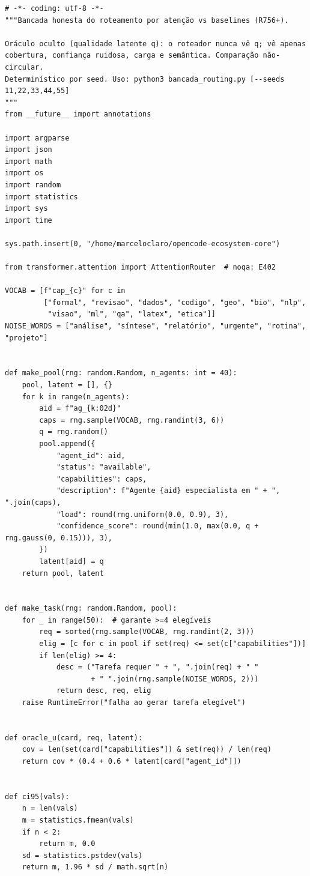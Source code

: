 \documentclass[12pt,openany,oneside,a4paper,brazil,chapter=TITLE]{abntex2}
\begin{document}
\begin{lstlisting}
# -*- coding: utf-8 -*-
"""Bancada honesta do roteamento por atenção vs baselines (R756+).

Oráculo oculto (qualidade latente q): o roteador nunca vê q; vê apenas
cobertura, confiança ruidosa, carga e semântica. Comparação não-circular.
Determinístico por seed. Uso: python3 bancada_routing.py [--seeds 11,22,33,44,55]
"""
from __future__ import annotations

import argparse
import json
import math
import os
import random
import statistics
import sys
import time

sys.path.insert(0, "/home/marceloclaro/opencode-ecosystem-core")

from transformer.attention import AttentionRouter  # noqa: E402

VOCAB = [f"cap_{c}" for c in
         ["formal", "revisao", "dados", "codigo", "geo", "bio", "nlp",
          "visao", "ml", "qa", "latex", "etica"]]
NOISE_WORDS = ["análise", "síntese", "relatório", "urgente", "rotina", "projeto"]


def make_pool(rng: random.Random, n_agents: int = 40):
    pool, latent = [], {}
    for k in range(n_agents):
        aid = f"ag_{k:02d}"
        caps = rng.sample(VOCAB, rng.randint(3, 6))
        q = rng.random()
        pool.append({
            "agent_id": aid,
            "status": "available",
            "capabilities": caps,
            "description": f"Agente {aid} especialista em " + ", ".join(caps),
            "load": round(rng.uniform(0.0, 0.9), 3),
            "confidence_score": round(min(1.0, max(0.0, q + rng.gauss(0, 0.15))), 3),
        })
        latent[aid] = q
    return pool, latent


def make_task(rng: random.Random, pool):
    for _ in range(50):  # garante >=4 elegíveis
        req = sorted(rng.sample(VOCAB, rng.randint(2, 3)))
        elig = [c for c in pool if set(req) <= set(c["capabilities"])]
        if len(elig) >= 4:
            desc = ("Tarefa requer " + ", ".join(req) + " "
                    + " ".join(rng.sample(NOISE_WORDS, 2)))
            return desc, req, elig
    raise RuntimeError("falha ao gerar tarefa elegível")


def oracle_u(card, req, latent):
    cov = len(set(card["capabilities"]) & set(req)) / len(req)
    return cov * (0.4 + 0.6 * latent[card["agent_id"]])


def ci95(vals):
    n = len(vals)
    m = statistics.fmean(vals)
    if n < 2:
        return m, 0.0
    sd = statistics.pstdev(vals)
    return m, 1.96 * sd / math.sqrt(n)



\end{lstlisting}
\end{document}
